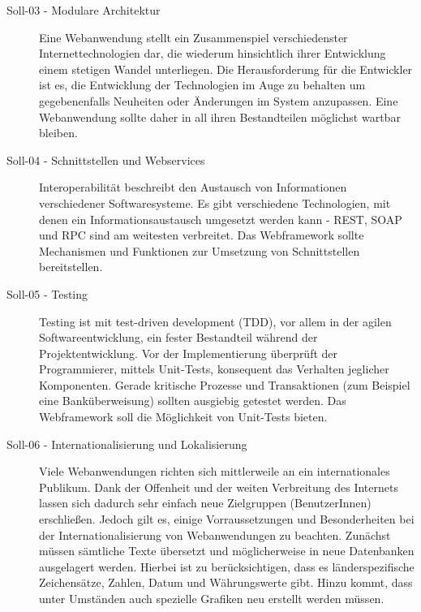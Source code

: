 \begin{description}
    \item[Soll-03 - Modulare Architektur\label{itm:Soll-03}]

    Eine Webanwendung stellt ein Zusammenspiel verschiedenster
    Internettechnologien dar, die wiederum hinsichtlich ihrer Entwicklung einem
    stetigen Wandel unterliegen. Die Herausforderung für die Entwickler ist es,
    die Entwicklung der Technologien im Auge zu behalten um gegebenenfalls
    Neuheiten oder Änderungen im System anzupassen. Eine Webanwendung sollte
    daher in all ihren Bestandteilen möglichst wartbar bleiben.

    \item[Soll-04 - Schnittstellen und Webservices\label{itm:Soll-04}]

    Interoperabilität beschreibt den Austausch von Informationen verschiedener
    Softwaresysteme. Es gibt verschiedene Technologien, mit denen ein
    Informationsaustausch umgesetzt werden kann - REST, SOAP und RPC sind am
    weitesten verbreitet. Das Webframework sollte Mechanismen und Funktionen
    zur Umsetzung von Schnittstellen bereitstellen.

    \item[Soll-05 - Testing\label{itm:Soll-05}]

    Testing ist mit test-driven development (TDD), vor allem in der agilen
    Softwareentwicklung, ein fester Bestandteil während der Projektentwicklung.
    Vor der Implementierung überprüft der Programmierer, mittels Unit-Tests, 
    konsequent das Verhalten jeglicher Komponenten. Gerade kritische Prozesse
    und Transaktionen (zum Beispiel eine Banküberweisung) sollten ausgiebig
    getestet werden. Das Webframework soll die Möglichkeit von Unit-Tests
    bieten.

    \item[Soll-06 - Internationalisierung und Lokalisierung\label{itm:Soll-06}]

    Viele Webanwendungen richten sich mittlerweile an ein internationales
    Publikum. Dank der Offenheit und der weiten Verbreitung des Internets lassen
    sich dadurch sehr einfach neue Zielgruppen (BenutzerInnen) erschließen.
    Jedoch gilt es, einige Vorraussetzungen und Besonderheiten bei der
    Internationalisierung von Webanwendungen zu beachten. Zunächst müssen
    sämtliche Texte übersetzt und möglicherweise in neue Datenbanken ausgelagert
    werden. Hierbei ist zu berücksichtigen, dass es länderspezifische
    Zeichensätze, Zahlen, Datum und Währungswerte gibt. Hinzu kommt, dass unter
    Umständen auch spezielle Grafiken neu erstellt werden müssen.


\end{description}
